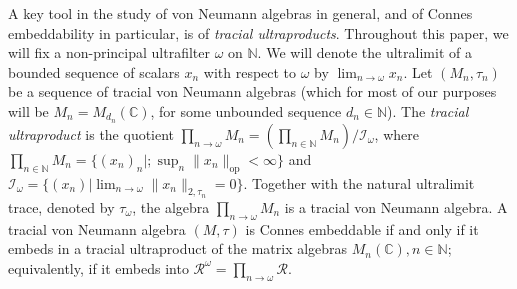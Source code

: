 \documentclass[11pt]{amsart}
\DeclareMathOperator{\op}{op}
\newcommand{\ultprod}[1]{\prod_{#1 \to \omega}}
\newcommand{\ultlim}[1]{\lim_{#1 \to \omega}}
\newcommand{\N}{{\mathbb{N}}}
\newcommand{\C}{{\mathbb{C}}}
\newcommand{\cI}{{\mathcal{I}}}
\theoremstyle{definition}
\theoremstyle{remark}
\theoremstyle{definition}
\begin{document}
A key tool in the study of von Neumann algebras in general, and of Connes embeddability in particular, is of \emph{tracial ultraproducts}. 
Throughout this paper, we will fix a non-principal ultrafilter $\omega$ on $\N$.
We will denote the ultralimit of a bounded sequence of scalars $x_n$ with respect to $\omega$ by $\ultlim{n} x_n$.
Let $(M_n, \tau_n)$ be a sequence of tracial von Neumann algebras (which for most of our purposes will be $M_n = M_{d_n}(\C)$, for some unbounded sequence $d_n \in \N$). 
The \emph{tracial ultraproduct} is the quotient $\ultprod{n} M_n = \left(\prod_{n \in \N} M_n \right) / \mathcal I_\omega$, where $\prod_{n \in \N} M_n = \{ (x_n)_n | ; \sup_n \| x_n \|_{\op} < \infty \}$ and  $\cI_\omega = \{ (x_n) | \ultlim{n} \| x_n \|_{2,\tau_n} = 0\}$.
Together with the natural ultralimit trace, denoted by $\tau_\omega$, the algebra $\prod_{n \to \omega} M_n$ is a tracial von Neumann algebra.
A  tracial von Neumann algebra $(M,\tau)$ is Connes embeddable if and only if it embeds in a tracial ultraproduct of the matrix algebras $M_n(\C), n \in \N$; equivalently, if it embeds into $\mathcal R^\omega=\prod_{n\to \omega}\mathcal{R}$. 
\end{document}
